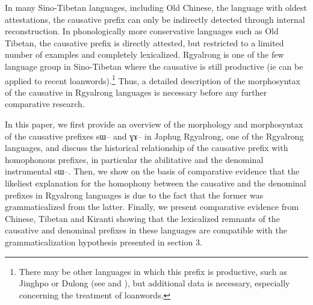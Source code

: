 \documentclass[oldfontcommands,oneside,a4paper,11pt]{article}
\newcommand{\ipa}[1]{{\phon \mbox{#1}}} %
\begin{document}
In many Sino-Tibetan languages, including Old Chinese, the  language with oldest attestations, the causative prefix can only be indirectly detected through internal reconstruction. In  phonologically more conservative languages such as Old Tibetan, the causative prefix is directly attested, but restricted to a limited number of examples and completely lexicalized. Rgyalrong is one of the few language group in Sino-Tibetan where the causative is still productive (ie can be applied to recent loanwords).\footnote{There may be other languages in which this prefix is productive, such as Jinghpo or Dulong (see \citealt[71-8]{dai90yufa} and \citealt[101-2]{sunhk82dulong}), but additional data is necessary, especially concerning the treatment of loanwords.} Thus, a detailed description of the morphosyntax of the causative in Rgyalrong languages is necessary before any further comparative research.

In this paper, we first provide an overview of the morphology and morphosyntax of the causative prefixes \ipa{sɯ--} and \ipa{ɣɤ--} in Japhug Rgyalrong, one of the Rgyalrong languages, and discuss the historical relationship of the causative prefix with homophonous prefixes, in particular the abilitative and the denominal instrumental \ipa{sɯ--}. Then, we show on the basis of comparative evidence that the likeliest explanation for the homophony between the causative and the denominal prefixes in Rgyalrong languages is due to the fact that the former was grammaticalized from the latter.
Finally, we present comparative evidence from Chinese, Tibetan and Kiranti showing that the lexicalized remnants of the causative and denominal prefixes in these languages are compatible with the grammaticalization hypothesis presented in section 3.

%
%
%
\end{document}
